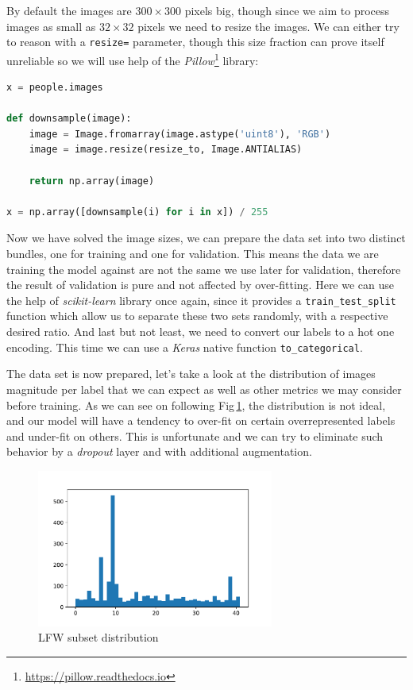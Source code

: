 By default the images are $300\times300$ pixels big, though since we aim to process images as small as $32\times32$ pixels we need to resize the images. We can either try to reason with a \texttt{resize=} parameter, though this size fraction can prove itself unreliable so we will use help of the \textit{Pillow}\footnote{\url{https://pillow.readthedocs.io}} library:

\begin{lstlisting}[language=Python, caption=Pre-processing of the data set]
x = people.images

def downsample(image):
    image = Image.fromarray(image.astype('uint8'), 'RGB')
    image = image.resize(resize_to, Image.ANTIALIAS)

    return np.array(image)

x = np.array([downsample(i) for i in x]) / 255
\end{lstlisting}

Now we have solved the image sizes, we can prepare the data set into two distinct bundles, one for training and one for validation. This means the data we are training the model against are not the same we use later for validation, therefore the result of validation is pure and not affected by over-fitting. Here we can use the help of \textit{scikit-learn} library once again, since it provides a \texttt{train\_test\_split} function which allow us to separate these two sets randomly, with a respective desired ratio. And last but not least, we need to convert our labels to a hot one encoding. This time we can use a \textit{Keras} native function \texttt{to\_categorical}.

The data set is now prepared, let's take a look at the distribution of images magnitude per label that we can expect as well as other metrics we may consider before training. As we can see on following Fig\,\ref{fig:lfw_distribution}, the distribution is not ideal, and our model will have a tendency to over-fit on certain overrepresented labels and under-fit on others. This is unfortunate and we can try to eliminate such behavior by a \textit{dropout} layer and with additional augmentation.

\begin{figure}[ht]
    \centering
    \includegraphics[height=14em]{obrazky-figures/lfw_distribution.pdf}
    \caption{LFW subset distribution}
    \label{fig:lfw_distribution}
\end{figure}


